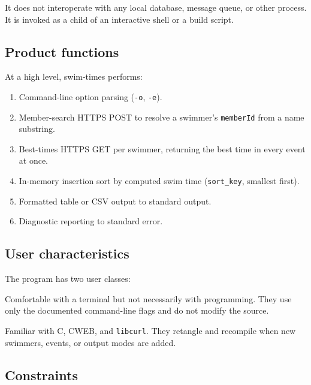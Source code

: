 \documentclass[12pt]{article}
\newcommand{\code}[1]{\texttt{#1}}
\begin{document}
It does not interoperate with any local database, message queue,
or other process.  It is invoked as a child of an interactive
shell or a build script.

\subsection{Product functions}

At a high level, swim-times performs:

\begin{enumerate}
  \item Command-line option parsing (\code{-o}, \code{-e}).
  \item Member-search HTTPS POST to resolve a swimmer's
        \code{memberId} from a name substring.
  \item Best-times HTTPS GET per swimmer, returning the best time
        in every event at once.
  \item In-memory insertion sort by computed swim time
        (\code{sort\_key}, smallest first).
  \item Formatted table or CSV output to standard output.
  \item Diagnostic reporting to standard error.
\end{enumerate}

\subsection{User characteristics}

The program has two user classes:

\begin{description}[style=nextline]
  \item[Coaches and parents.]
        Comfortable with a terminal but not necessarily with
        programming.  They use only the documented command-line
        flags and do not modify the source.
  \item[Maintainers.]
        Familiar with C, CWEB, and \code{libcurl}.  They retangle
        and recompile when new swimmers, events, or output modes
        are added.
\end{description}

\subsection{Constraints}
\end{document}
